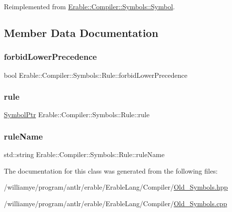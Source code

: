 Reimplemented from \mbox{\hyperlink{class_erable_1_1_compiler_1_1_symbols_1_1_symbol_ac133ad05913f81e836ae2f73815d1432}{Erable\+::\+Compiler\+::\+Symbols\+::\+Symbol}}.



\subsection{Member Data Documentation}
\mbox{\label{class_erable_1_1_compiler_1_1_symbols_1_1_rule_a040b3ef6b4d88220130b8a8a0de2b299}} 
\subsubsection{\texorpdfstring{forbidLowerPrecedence}{forbidLowerPrecedence}}
{\footnotesize\ttfamily bool Erable\+::\+Compiler\+::\+Symbols\+::\+Rule\+::forbid\+Lower\+Precedence}

\mbox{\label{class_erable_1_1_compiler_1_1_symbols_1_1_rule_a12427a19c09e0286bb2b59cc78bd7fd5}} 
\subsubsection{\texorpdfstring{rule}{rule}}
{\footnotesize\ttfamily \mbox{\hyperlink{namespace_erable_1_1_compiler_1_1_symbols_a8f0bc762f448ea4d84e8713ab3e140b9}{Symbol\+Ptr}} Erable\+::\+Compiler\+::\+Symbols\+::\+Rule\+::rule}

\mbox{\label{class_erable_1_1_compiler_1_1_symbols_1_1_rule_a099515287a10e4fd5412612d852ae2ca}} 
\subsubsection{\texorpdfstring{ruleName}{ruleName}}
{\footnotesize\ttfamily std\+::string Erable\+::\+Compiler\+::\+Symbols\+::\+Rule\+::rule\+Name}



The documentation for this class was generated from the following files\+:\begin{DoxyCompactItemize}
\item 
/williamye/program/antlr/erable/\+Erable\+Lang/\+Compiler/\mbox{\hyperlink{_old___symbols_8hpp}{Old\+\_\+\+Symbols.\+hpp}}\item 
/williamye/program/antlr/erable/\+Erable\+Lang/\+Compiler/\mbox{\hyperlink{_old___symbols_8cpp}{Old\+\_\+\+Symbols.\+cpp}}\end{DoxyCompactItemize}
